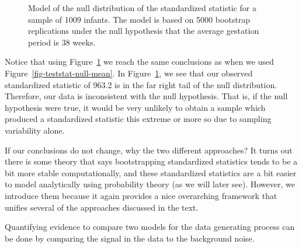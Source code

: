 \documentclass[
  letterpaper,
  DIV=11,
  numbers=noendperiod]{scrreprt}
\theoremstyle{definition}
\theoremstyle{definition}
\theoremstyle{plain}
\theoremstyle{remark}
\begin{document}
\begin{figure}


\caption{\label{fig-teststat-null}Model of the null distribution of the
standardized statistic for a sample of 1009 infants. The model is based
on 5000 bootstrap replications under the null hypothesis that the
average gestation period is 38 weeks.}

\end{figure}%

Notice that using Figure~\ref{fig-teststat-null} we reach the same
conclusions as when we used Figure~\ref{fig-teststat-null-mean}. In
Figure~\ref{fig-teststat-null}, we see that our observed standardized
statistic of 963.2 is in the far right tail of the null distribution.
Therefore, our data is inconsistent with the null hypothesis. That is,
if the null hypothesis were true, it would be very unlikely to obtain a
sample which produced a standardized statistic this extreme or more so
due to sampling variability alone.

If our conclusions do not change, why the two different approaches? It
turns out there is some theory that says bootstrapping standardized
statistics tends to be a bit more stable computationally, and these
standardized statistics are a bit easier to model analytically using
probability theory (as we will later see). However, we introduce them
because it again provides a nice overarching framework that unifies
several of the approaches discussed in the text.

\begin{tcolorbox}[enhanced jigsaw, colbacktitle=quarto-callout-tip-color!10!white, colback=white, left=2mm, title=\textcolor{quarto-callout-tip-color}{\faLightbulb}\hspace{0.5em}{Big Idea}, toptitle=1mm, leftrule=.75mm, breakable, bottomrule=.15mm, arc=.35mm, rightrule=.15mm, toprule=.15mm, coltitle=black, opacityback=0, colframe=quarto-callout-tip-color-frame, opacitybacktitle=0.6, bottomtitle=1mm, titlerule=0mm]

Quantifying evidence to compare two models for the data generating
process can be done by comparing the signal in the data to the
background noise.

\end{tcolorbox}
\end{document}
